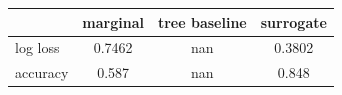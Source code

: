 \begin{tabular}{lccc}
\toprule
 & marginal & tree baseline & surrogate \\
\midrule
log loss & 0.7462 & nan & 0.3802 \\
accuracy & 0.587 & nan & 0.848 \\
\bottomrule
\end{tabular}
